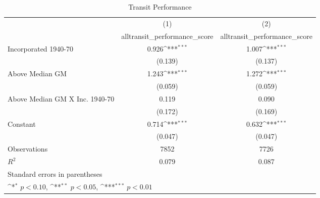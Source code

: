 \begin{table}[htbp]\centering
\def\sym#1{\ifmmode^{#1}\else\(^{#1}\)\fi}
\caption{Transit Performance}
\begin{tabular}{l*{2}{c}}
\hline\hline
                    &\multicolumn{1}{c}{(1)}&\multicolumn{1}{c}{(2)}\\
                    &\multicolumn{1}{c}{alltransit\_performance\_score}&\multicolumn{1}{c}{alltransit\_performance\_score}\\
\hline
Incorporated 1940-70&       0.926\sym{***}&       1.007\sym{***}\\
                    &     (0.139)         &     (0.137)         \\
[1em]
Above Median GM     &       1.243\sym{***}&       1.272\sym{***}\\
                    &     (0.059)         &     (0.059)         \\
[1em]
Above Median GM X Inc. 1940-70&       0.119         &       0.090         \\
                    &     (0.172)         &     (0.169)         \\
[1em]
Constant            &       0.714\sym{***}&       0.632\sym{***}\\
                    &     (0.047)         &     (0.047)         \\
\hline
Observations        &        7852         &        7726         \\
\(R^{2}\)           &       0.079         &       0.087         \\
\hline\hline
\multicolumn{3}{l}{\footnotesize Standard errors in parentheses}\\
\multicolumn{3}{l}{\footnotesize \sym{*} \(p<0.10\), \sym{**} \(p<0.05\), \sym{***} \(p<0.01\)}\\
\end{tabular}
\end{table}
